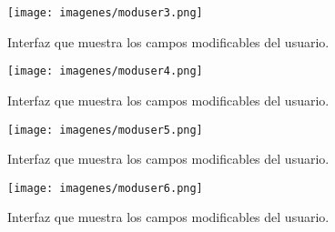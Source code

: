 \begin{figure}[h!]
	\label{moduser3}
	\begin{center}
		\texttt{[image: imagenes/moduser3.png]}
	\end{center}
	\caption{Interfaz que muestra los campos modificables del usuario.}
\end{figure}
\begin{figure}[h!]
	\label{moduser4}
	\begin{center}
		\texttt{[image: imagenes/moduser4.png]}
	\end{center}
	\caption{Interfaz que muestra los campos modificables del usuario.}
\end{figure}

\begin{figure}[h!]
	\label{moduser5}
	\begin{center}
		\texttt{[image: imagenes/moduser5.png]}
	\end{center}
	\caption{Interfaz que muestra los campos modificables del usuario.}
\end{figure}

\begin{figure}[h!]
	\label{moduser6}
	\begin{center}
		\texttt{[image: imagenes/moduser6.png]}
	\end{center}
	\caption{Interfaz que muestra los campos modificables del usuario.}
\end{figure}

